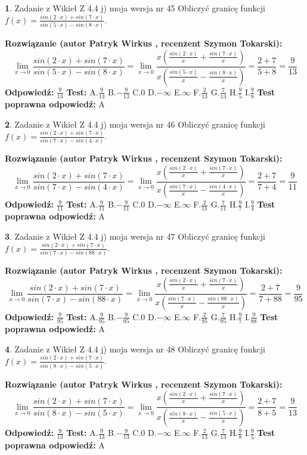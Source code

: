 \documentclass[12pt, a4paper]{article}
\theoremstyle{definition} %
\newtheorem{zad}{}
\newcommand{\zadStart}[1]{\begin{zad}#1\newline}
\newcommand{\zadStop}{\end{zad}}
\newcommand{\rozwStart}[2]{\noindent \textbf{Rozwiązanie (autor #1 , recenzent #2): }\newline}
\newcommand{\rozwStop}{\newline}
\newcommand{\odpStart}{\noindent \textbf{Odpowiedź:}\newline}
\newcommand{\odpStop}{\newline}
\newcommand{\testStart}{\noindent \textbf{Test:}\newline}
\newcommand{\testStop}{\newline}
\newcommand{\kluczStart}{\noindent \textbf{Test poprawna odpowiedź:}\newline}
\newcommand{\kluczStop}{\newline}
\begin{document}
\zadStart{Zadanie z Wikieł Z 4.4 j) moja wersja nr 45}
Obliczyć granicę funkcji $f(x)=\frac{sin(2\cdot x) +sin(7\cdot x)}{sin(5\cdot x) -sin(8\cdot x)}$.
\zadStop
\rozwStart{Patryk Wirkus}{Szymon Tokarski}
$$\lim\limits_{x\to 0}\frac{sin(2\cdot x) +sin(7\cdot x)}{sin(5\cdot x) -sin(8\cdot x)}=\lim\limits_{x\to 0}\frac{x(\frac{sin(2\cdot x)}{x}+\frac{sin(7\cdot x)}{x})}{x(\frac{sin(5\cdot x)}{x}-\frac{sin(8\cdot x)}{x})}=\frac{2+7}{5+8} = \frac{9}{13}$$
\rozwStop
\odpStart
$\frac{9}{13}$
\odpStop
\testStart
A.$\frac{9}{13}$
B.$-\frac{9}{13}$
C.$0$
D.$-\infty$
E.$\infty$
F.$\frac{2}{13}$
G.$\frac{7}{13}$
H.$\frac{9}{5}$
I.$\frac{9}{8}$
\testStop
\kluczStart
A
\kluczStop



\zadStart{Zadanie z Wikieł Z 4.4 j) moja wersja nr 46}
Obliczyć granicę funkcji $f(x)=\frac{sin(2\cdot x) +sin(7\cdot x)}{sin(7\cdot x) -sin(4\cdot x)}$.
\zadStop
\rozwStart{Patryk Wirkus}{Szymon Tokarski}
$$\lim\limits_{x\to 0}\frac{sin(2\cdot x) +sin(7\cdot x)}{sin(7\cdot x) -sin(4\cdot x)}=\lim\limits_{x\to 0}\frac{x(\frac{sin(2\cdot x)}{x}+\frac{sin(7\cdot x)}{x})}{x(\frac{sin(7\cdot x)}{x}-\frac{sin(4\cdot x)}{x})}=\frac{2+7}{7+4} = \frac{9}{11}$$
\rozwStop
\odpStart
$\frac{9}{11}$
\odpStop
\testStart
A.$\frac{9}{11}$
B.$-\frac{9}{11}$
C.$0$
D.$-\infty$
E.$\infty$
F.$\frac{2}{11}$
G.$\frac{7}{11}$
H.$\frac{9}{7}$
I.$\frac{9}{4}$
\testStop
\kluczStart
A
\kluczStop



\zadStart{Zadanie z Wikieł Z 4.4 j) moja wersja nr 47}
Obliczyć granicę funkcji $f(x)=\frac{sin(2\cdot x) +sin(7\cdot x)}{sin(7\cdot x) -sin(88\cdot x)}$.
\zadStop
\rozwStart{Patryk Wirkus}{Szymon Tokarski}
$$\lim\limits_{x\to 0}\frac{sin(2\cdot x) +sin(7\cdot x)}{sin(7\cdot x) -sin(88\cdot x)}=\lim\limits_{x\to 0}\frac{x(\frac{sin(2\cdot x)}{x}+\frac{sin(7\cdot x)}{x})}{x(\frac{sin(7\cdot x)}{x}-\frac{sin(88\cdot x)}{x})}=\frac{2+7}{7+88} = \frac{9}{95}$$
\rozwStop
\odpStart
$\frac{9}{95}$
\odpStop
\testStart
A.$\frac{9}{95}$
B.$-\frac{9}{95}$
C.$0$
D.$-\infty$
E.$\infty$
F.$\frac{2}{95}$
G.$\frac{7}{95}$
H.$\frac{9}{7}$
I.$\frac{9}{88}$
\testStop
\kluczStart
A
\kluczStop



\zadStart{Zadanie z Wikieł Z 4.4 j) moja wersja nr 48}
Obliczyć granicę funkcji $f(x)=\frac{sin(2\cdot x) +sin(7\cdot x)}{sin(8\cdot x) -sin(5\cdot x)}$.
\zadStop
\rozwStart{Patryk Wirkus}{Szymon Tokarski}
$$\lim\limits_{x\to 0}\frac{sin(2\cdot x) +sin(7\cdot x)}{sin(8\cdot x) -sin(5\cdot x)}=\lim\limits_{x\to 0}\frac{x(\frac{sin(2\cdot x)}{x}+\frac{sin(7\cdot x)}{x})}{x(\frac{sin(8\cdot x)}{x}-\frac{sin(5\cdot x)}{x})}=\frac{2+7}{8+5} = \frac{9}{13}$$
\rozwStop
\odpStart
$\frac{9}{13}$
\odpStop
\testStart
A.$\frac{9}{13}$
B.$-\frac{9}{13}$
C.$0$
D.$-\infty$
E.$\infty$
F.$\frac{2}{13}$
G.$\frac{7}{13}$
H.$\frac{9}{8}$
I.$\frac{9}{5}$
\testStop
\kluczStart
A
\kluczStop
\end{document}

